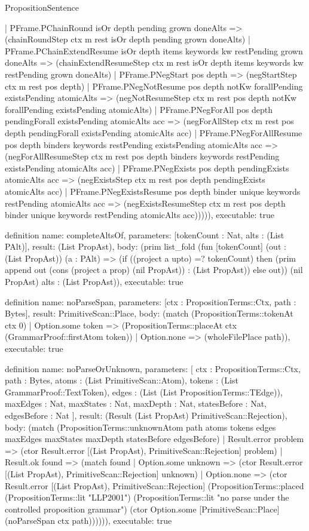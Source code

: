 \begin{lexlean}{PropositionSentence}
\begin{semanticmodule}
{            | PFrame.PChainRound isOr depth pending grown doneAlts => (chainRoundStep ctx m rest isOr depth pending grown doneAlts)
            | PFrame.PChainExtendResume isOr depth items keywords kw restPending grown doneAlts => (chainExtendResumeStep ctx m rest isOr depth items keywords kw restPending grown doneAlts)
            | PFrame.PNegStart pos depth => (negStartStep ctx m rest pos depth)
            | PFrame.PNegNotResume pos depth notKw forallPending existsPending atomicAlts => (negNotResumeStep ctx m rest pos depth notKw forallPending existsPending atomicAlts)
            | PFrame.PNegForAll pos depth pendingForall existsPending atomicAlts acc => (negForAllStep ctx m rest pos depth pendingForall existsPending atomicAlts acc)
            | PFrame.PNegForAllResume pos depth binders keywords restPending existsPending atomicAlts acc => (negForAllResumeStep ctx m rest pos depth binders keywords restPending existsPending atomicAlts acc)
            | PFrame.PNegExists pos depth pendingExists atomicAlts acc => (negExistsStep ctx m rest pos depth pendingExists atomicAlts acc)
            | PFrame.PNegExistsResume pos depth binder unique keywords restPending atomicAlts acc => (negExistsResumeStep ctx m rest pos depth binder unique keywords restPending atomicAlts acc))))),
  executable: true
}

definition{
  name: completeAltsOf,
  parameters: [tokenCount : Nat, alts : (List PAlt)],
  result: (List PropAst),
  body: (prim list_fold (fun [tokenCount] (out : (List PropAst)) (a : PAlt) => (if ((project a upto) =? tokenCount) then (prim append out (cons (project a prop) (nil PropAst)) : (List PropAst)) else out)) (nil PropAst) alts : (List PropAst)),
  executable: true
}

definition{
  name: noParseSpan,
  parameters: [ctx : PropositionTerms::Ctx, path : Bytes],
  result: PrimitiveScan::Place,
  body: (match (PropositionTerms::tokenAt ctx 0)
    | Option.some token => (PropositionTerms::placeAt ctx (GrammarProof::firstAtom token))
    | Option.none => (wholeFilePlace path)),
  executable: true
}

definition{
  name: noParseOrUnknown,
  parameters: [
    ctx : PropositionTerms::Ctx,
    path : Bytes,
    atoms : (List PrimitiveScan::Atom),
    tokens : (List GrammarProof::TextToken),
    edges : (List (List PropositionTerms::TEdge)),
    maxEdges : Nat,
    maxStates : Nat,
    maxDepth : Nat,
    statesBefore : Nat,
    edgesBefore : Nat
  ],
  result: (Result (List PropAst) PrimitiveScan::Rejection),
  body: (match (PropositionTerms::unknownAtom path atoms tokens edges maxEdges maxStates maxDepth statesBefore edgesBefore)
    | Result.error problem => (ctor Result.error [(List PropAst), PrimitiveScan::Rejection] problem)
    | Result.ok found => (match found
        | Option.some unknown => (ctor Result.error [(List PropAst), PrimitiveScan::Rejection] unknown)
        | Option.none => (ctor Result.error [(List PropAst), PrimitiveScan::Rejection] (PropositionTerms::placed (PropositionTerms::lit "LLP2001") (PropositionTerms::lit "no parse under the controlled proposition grammar") (ctor Option.some [PrimitiveScan::Place] (noParseSpan ctx path)))))),
  executable: true
}


\end{semanticmodule}
\end{lexlean}
